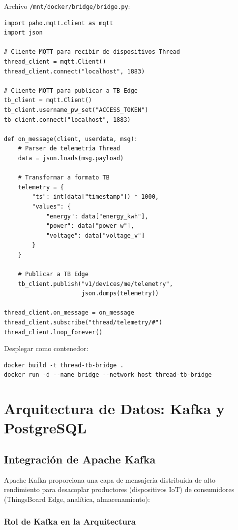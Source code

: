 Archivo \texttt{/mnt/docker/bridge/bridge.py}:
\begin{verbatim}
import paho.mqtt.client as mqtt
import json

# Cliente MQTT para recibir de dispositivos Thread
thread_client = mqtt.Client()
thread_client.connect("localhost", 1883)

# Cliente MQTT para publicar a TB Edge
tb_client = mqtt.Client()
tb_client.username_pw_set("ACCESS_TOKEN")
tb_client.connect("localhost", 1883)

def on_message(client, userdata, msg):
    # Parser de telemetría Thread
    data = json.loads(msg.payload)
    
    # Transformar a formato TB
    telemetry = {
        "ts": int(data["timestamp"]) * 1000,
        "values": {
            "energy": data["energy_kwh"],
            "power": data["power_w"],
            "voltage": data["voltage_v"]
        }
    }
    
    # Publicar a TB Edge
    tb_client.publish("v1/devices/me/telemetry", 
                      json.dumps(telemetry))

thread_client.on_message = on_message
thread_client.subscribe("thread/telemetry/#")
thread_client.loop_forever()
\end{verbatim}

Desplegar como contenedor:
\begin{verbatim}
docker build -t thread-tb-bridge .
docker run -d --name bridge --network host thread-tb-bridge
\end{verbatim}

\section{Arquitectura de Datos: Kafka y PostgreSQL}

\subsection{Integración de Apache Kafka}

Apache Kafka proporciona una capa de mensajería distribuida de alto rendimiento para desacoplar productores (dispositivos IoT) de consumidores (ThingsBoard Edge, analítica, almacenamiento):

\subsubsection{Rol de Kafka en la Arquitectura}

